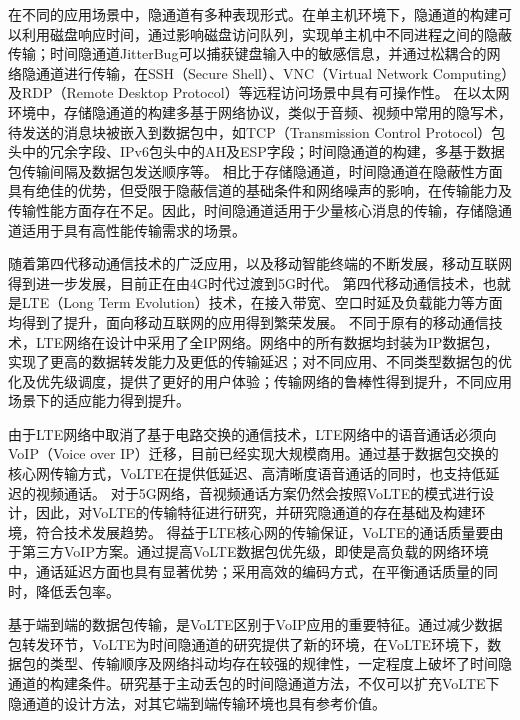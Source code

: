 在不同的应用场景中，隐通道有多种表现形式。在单主机环境下，隐通道的构建可以利用磁盘响应时间，通过影响磁盘访问队列，实现单主机中不同进程之间的隐蔽传输；时间隐通道JitterBug可以捕获键盘输入中的敏感信息，并通过松耦合的网络隐通道进行传输，在SSH（Secure Shell）、VNC（Virtual Network Computing）及RDP（Remote Desktop Protocol）等远程访问场景中具有可操作性。
在以太网环境中，存储隐通道的构建多基于网络协议，类似于音频、视频中常用的隐写术，待发送的消息块被嵌入到数据包中，如TCP（Transmission Control Protocol）包头中的冗余字段、IPv6包头中的AH及ESP字段；时间隐通道的构建，多基于数据包传输间隔及数据包发送顺序等。
相比于存储隐通道，时间隐通道在隐蔽性方面具有绝佳的优势，但受限于隐蔽信道的基础条件和网络噪声的影响，在传输能力及传输性能方面存在不足。因此，时间隐通道适用于少量核心消息的传输，存储隐通道适用于具有高性能传输需求的场景。

随着第四代移动通信技术的广泛应用，以及移动智能终端的不断发展，移动互联网得到进一步发展，目前正在由4G时代过渡到5G时代。
第四代移动通信技术，也就是LTE（Long Term Evolution）技术，在接入带宽、空口时延及负载能力等方面均得到了提升，面向移动互联网的应用得到繁荣发展。
不同于原有的移动通信技术，LTE网络在设计中采用了全IP网络。网络中的所有数据均封装为IP数据包，实现了更高的数据转发能力及更低的传输延迟；对不同应用、不同类型数据包的优化及优先级调度，提供了更好的用户体验；传输网络的鲁棒性得到提升，不同应用场景下的适应能力得到提升。

由于LTE网络中取消了基于电路交换的通信技术，LTE网络中的语音通话必须向VoIP（Voice over IP）迁移，目前已经实现大规模商用。通过基于数据包交换的核心网传输方式，VoLTE在提供低延迟、高清晰度语音通话的同时，也支持低延迟的视频通话。
对于5G网络，音视频通话方案仍然会按照VoLTE的模式进行设计，因此，对VoLTE的传输特征进行研究，并研究隐通道的存在基础及构建环境，符合技术发展趋势。
得益于LTE核心网的传输保证，VoLTE的通话质量要由于第三方VoIP方案。通过提高VoLTE数据包优先级，即使是高负载的网络环境中，通话延迟方面也具有显著优势；采用高效的编码方式，在平衡通话质量的同时，降低丢包率。

基于端到端的数据包传输，是VoLTE区别于VoIP应用的重要特征。通过减少数据包转发环节，VoLTE为时间隐通道的研究提供了新的环境，在VoLTE环境下，数据包的类型、传输顺序及网络抖动均存在较强的规律性，一定程度上破坏了时间隐通道的构建条件。研究基于主动丢包的时间隐通道方法，不仅可以扩充VoLTE下隐通道的设计方法，对其它端到端传输环境也具有参考价值。